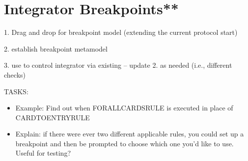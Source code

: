 \newpage
\section{Integrator Breakpoints**}
\genHeader

1. Drag and drop for breakpoint model (extending the current protocol start)

2. establish breakpoint metamodel

3. use to control integrator via existing -- update 2. as needed (i.e., different checks)

TASKS:

\begin{itemize}
  
  \item Example: Find out when FORALLCARDSRULE is executed in place of CARDTOENTRYRULE
  
  \item Explain: if there were ever two different applicable rules, you could set up a breakpoint and then be prompted to choose which one you'd like to use.
  Useful for testing?

\end{itemize}
